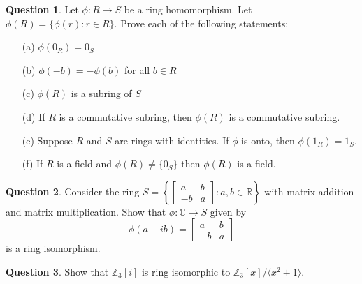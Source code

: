 \documentclass[11pt]{amsart}
\theoremstyle{definition}\newtheorem{definition}{Definition}
\theoremstyle{definition}\newtheorem{question}{Question}
\theoremstyle{definition}\newtheorem*{solution}{Solution}
\theoremstyle{definition}\newtheorem{example}{Example}
\theoremstyle{definition}\newtheorem{notation}{Notation}
\theoremstyle{theorem}\newtheorem{theorem}{Theorem}
\theoremstyle{theorem}\newtheorem{corollary}{Corollary}
\theoremstyle{theorem}\newtheorem{lemma}{Lemma}
\theoremstyle{theorem}\newtheorem{proposition}{Proposition}
\newcommand{\C}{\mathbb{C}}
\newcommand{\R}{\mathbb{R}}
\newcommand{\Z}{\mathbb{Z}}
\begin{document}
\begin{question}
    Let $\phi : R \to S$ be a ring homomorphism. Let $\phi(R) = \{\phi(r) : r \in R\}$. Prove each of the following statements:
    \begin{itemize}
        \item[(a)] $\phi(0_R) = 0_S$
        \item[(b)] $\phi(-b) = -\phi(b)$ for all $b \in R$
        \item[(c)] $\phi(R)$ is a subring of $S$
        \item[(d)] If $R$ is a commutative subring, then $\phi(R)$ is a commutative subring.
        \item[(e)] Suppose $R$ and $S$ are rings with identities. If $\phi$ is onto, then $\phi(1_R) = 1_S$.
        \item[(f)] If $R$ is a field and $\phi(R) \neq \{0_S\}$ then $\phi(R)$ is a field.
    \end{itemize}
\end{question}

\begin{question}
    Consider the ring $S = \left\{\begin{bmatrix} a & b \\ -b & a \end{bmatrix} : a, b \in \R\right\}$ with matrix addition and matrix multiplication. Show that $\phi : \C \to S$ given by
    \begin{equation*}
        \phi(a + ib) = \begin{bmatrix} a & b \\ -b & a \end{bmatrix}
    \end{equation*}
    is a ring isomorphism.
\end{question}

\begin{question}
    Show that $\Z_3[i]$ is ring isomorphic to $\Z_3[x]/\langle{x^2 + 1}\rangle$.
\end{question}
\end{document}
